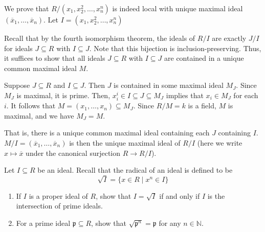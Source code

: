 \documentclass[12 pt, letterpaper]{hmcpset}
\begin{document}
\begin{solution}
	We prove that $R / (x_{1}, x_{2}^{2}, \dots, x_{n}^{n})$ is indeed local with unique maximal ideal $(\overline{x}_{1}, \dots, \overline{x}_{n})$. Let $I = (x_{1}, x_{2}^{2}, \dots, x_{n}^{n})$

	Recall that by the fourth isomorphism theorem, the ideals of $R / I$ are exactly $J / I$ for ideals $J \subseteq R$ with $I \subseteq J$. Note that this bijection is inclusion-preserving. Thus, it suffices to show that all ideals $J \subseteq R$ with $I \subseteq J$ are contained in a unique common maximal ideal $M$.

	Suppose $J \subseteq R$ and $I \subseteq J$. Then $J$ is contained in some maximal ideal $M_{J}$. Since $M_{J}$ is maximal, it is prime. Then,  $x_{i}^{i} \in I \subseteq J \subseteq M_{J}$ implies that $x_{i} \in M_{J}$ for each $i$. It follows that $M = (x_{1}, \dots, x_{n}) \subseteq M_{J}$. Since $R / M = k$ is a field, $M$ is maximal, and we have $M_{J} = M$. 

	That is, there is a unique common maximal ideal containing each $J$ containing $I$. $M / I = (\overline{x}_{1}, \dots, \overline{x}_{n})$ is then the unique maximal ideal of $R / I$ (here we write $x \mapsto \overline{x}$ under the canonical surjection $R \to R / I$).
\end{solution}

\pagebreak

\begin{problem}[3.]
	Let $I \subseteq R$ be an ideal. Recall that the radical of an ideal is defined to be
	\[
		\sqrt{I} = \{ x \in R \mid x^{n} \in I \}
	\]
	\begin{enumerate}
		\item If $I$ is a proper ideal of $R$, show that $I = \sqrt{I}$ if and only if $I$ is the intersection of prime ideals.

		\item For a prime ideal $\mathfrak{p} \subseteq R$, show that $\sqrt{\mathfrak{p}^{n}} = \mathfrak{p}$ for any $n \in \mathbb{N}$.
	\end{enumerate}
\end{problem}
\end{document}

